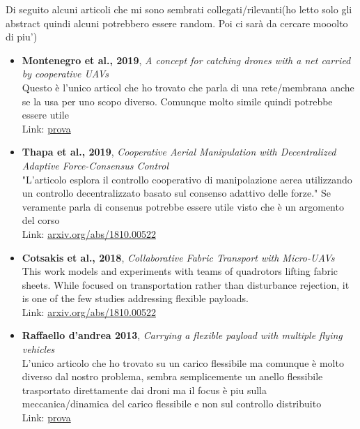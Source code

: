 \documentclass[11pt]{article}
\begin{document}
\vspace{-0.2cm}
Di seguito alcuni articoli che mi sono sembrati collegati/rilevanti(ho letto solo gli abstract quindi alcuni potrebbero essere random. Poi ci sarà da cercare mooolto di piu')
\begin{itemize}
     \item \textbf{Montenegro et al., 2019}, \emph{A concept for catching drones with a net carried by cooperative UAVs} \\
   Questo è l'unico articol che ho trovato che parla di una rete/membrana anche se la usa per uno scopo diverso. Comunque molto simile quindi potrebbe essere utile\\
    Link: \href{https://www.researchgate.net/publication/336088594_A_concept_for_catching_drones_with_a_net_carried_by_cooperative_UAVs}{prova}
    
     \item \textbf{Thapa et al., 2019}, \emph{Cooperative Aerial Manipulation with Decentralized Adaptive Force-Consensus Control} \\
    "L’articolo esplora il controllo cooperativo di manipolazione aerea utilizzando un controllo decentralizzato basato sul consenso adattivo delle forze." Se veramente parla di consenus potrebbe essere utile visto che è un argomento del corso \\
    Link: \href{https://link.springer.com/article/10.1007/s10846-019-01048-4?utm_source=chatgpt.com}{arxiv.org/abs/1810.00522}
    
     \item \textbf{Cotsakis et al., 2018}, \emph{Collaborative Fabric Transport with Micro-UAVs} \\
    This work models and experiments with teams of quadrotors lifting fabric sheets. While focused on transportation rather than disturbance rejection, it is one of the few studies addressing flexible payloads. \\
    Link: \href{https://arxiv.org/abs/1810.00522}{arxiv.org/abs/1810.00522}
    
     \item \textbf{Raffaello d'andrea 2013}, \emph{Carrying a flexible payload with multiple flying vehicles} \\
  L'unico articolo che ho trovato su un carico flessibile ma comunque è molto diverso dal nostro problema, sembra semplicemente un anello flessibile trasportato direttamente dai droni ma il focus è piu sulla meccanica/dinamica del carico flessibile e non sul controllo distribuito \\
    Link: \href{https://www.researchgate.net/publication/261353164_Carrying_a_flexible_payload_with_multiple_flying_vehicles}{prova}

   \end{itemize}
   
\end{document}
